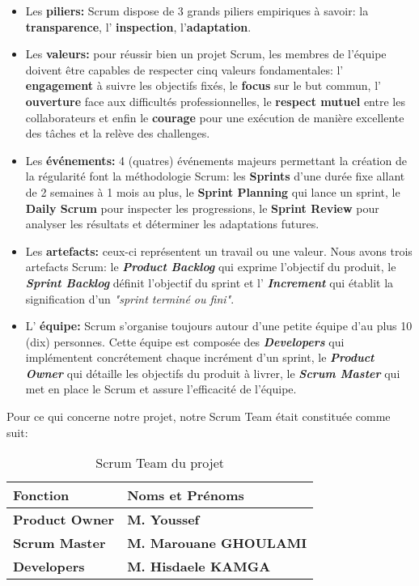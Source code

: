         \begin{itemize}
            \item Les \textbf{piliers: } Scrum dispose de 3 grands piliers empiriques à savoir: la \textbf{transparence}, l' \textbf{inspection},  l'\textbf{adaptation}.
            \item Les \textbf{valeurs: }pour réussir bien un projet Scrum, les membres de l'équipe doivent être capables de respecter cinq valeurs fondamentales: l' \textbf{engagement} à suivre les objectifs fixés, le \textbf{focus} sur le but commun, l' \textbf{ouverture} face aux difficultés professionnelles, le \textbf{respect mutuel} entre les collaborateurs et enfin le \textbf{courage} pour une exécution de manière excellente des tâches et la relève des challenges.
            \item Les \textbf{événements: } 4 (quatres) événements majeurs permettant la création de la régularité font la méthodologie Scrum: les \textbf{Sprints} d'une durée fixe allant de 2 semaines à 1 mois au plus, le \textbf{Sprint Planning} qui lance un sprint, le \textbf{Daily Scrum} pour inspecter les progressions, le \textbf{Sprint Review} pour analyser les résultats et déterminer les adaptations futures.
            \item Les \textbf{artefacts: }ceux-ci représentent un travail ou une valeur. Nous avons trois artefacts Scrum: le \textbf{\textit{Product Backlog}} qui exprime l'objectif du produit, le \textbf{\textit{Sprint Backlog}} définit l'objectif du sprint et l' \textbf{\textit{Increment}} qui établit la signification d'un \textit{"sprint terminé ou fini"}.
            
            \item L' \textbf{équipe: }Scrum s'organise toujours autour d'une petite équipe d'au plus 10 (dix) personnes. Cette équipe est composée des \textbf{\textit{Developers}} qui implémentent concrétement chaque incrément d'un sprint, le \textbf{\textit{Product Owner}} qui détaille les objectifs du produit à livrer, le \textbf{\textit{Scrum Master}} qui met en place le Scrum et assure l'efficacité de l'équipe.
        \end{itemize}
    Pour ce qui concerne notre projet, notre Scrum Team était constituée comme suit:
        \begin{table}[H]
            \centering
            \begin{tabular}{|l|l|}
                \hline
                \rowcolor{Gray}
                \textbf{Fonction} & \textbf{Noms et Prénoms} \\ \hline
                \textbf{Product Owner} & \textbf{M. Youssef} \\ \hline
                \textbf{Scrum Master} & \textbf{M. Marouane GHOULAMI} \\ \hline
                \textbf{Developers} & \textbf{M. Hisdaele KAMGA} \\ \hline  
            \end{tabular}
            \caption{Scrum Team du projet}
        \end{table}
